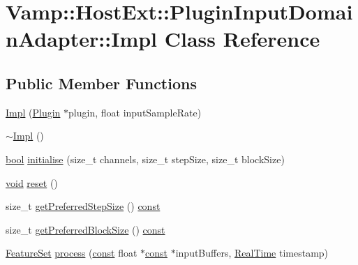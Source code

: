 \hypertarget{class_vamp_1_1_host_ext_1_1_plugin_input_domain_adapter_1_1_impl}{}\section{Vamp\+:\+:Host\+Ext\+:\+:Plugin\+Input\+Domain\+Adapter\+:\+:Impl Class Reference}
\label{class_vamp_1_1_host_ext_1_1_plugin_input_domain_adapter_1_1_impl}
\subsection*{Public Member Functions}
\begin{DoxyCompactItemize}
\item 
\hyperlink{class_vamp_1_1_host_ext_1_1_plugin_input_domain_adapter_1_1_impl_adffa09cc6be98d87cb33c1e92310c9fc}{Impl} (\hyperlink{class_vamp_1_1_plugin}{Plugin} $\ast$plugin, float input\+Sample\+Rate)
\item 
\hyperlink{class_vamp_1_1_host_ext_1_1_plugin_input_domain_adapter_1_1_impl_a2c75fc9191782ee69185c60f9b68cb90}{$\sim$\+Impl} ()
\item 
\hyperlink{mac_2config_2i386_2lib-src_2libsoxr_2soxr-config_8h_abb452686968e48b67397da5f97445f5b}{bool} \hyperlink{class_vamp_1_1_host_ext_1_1_plugin_input_domain_adapter_1_1_impl_a58c9bcbddcb7c3a1a3791b2a04e7372e}{initialise} (size\+\_\+t channels, size\+\_\+t step\+Size, size\+\_\+t block\+Size)
\item 
\hyperlink{sound_8c_ae35f5844602719cf66324f4de2a658b3}{void} \hyperlink{class_vamp_1_1_host_ext_1_1_plugin_input_domain_adapter_1_1_impl_ab4c8b082259289e412814c9a035bfc19}{reset} ()
\item 
size\+\_\+t \hyperlink{class_vamp_1_1_host_ext_1_1_plugin_input_domain_adapter_1_1_impl_a4380af577605306d2edab51042c71681}{get\+Preferred\+Step\+Size} () \hyperlink{getopt1_8c_a2c212835823e3c54a8ab6d95c652660e}{const} 
\item 
size\+\_\+t \hyperlink{class_vamp_1_1_host_ext_1_1_plugin_input_domain_adapter_1_1_impl_ab530681a774b29db3fd059149f4c1bf9}{get\+Preferred\+Block\+Size} () \hyperlink{getopt1_8c_a2c212835823e3c54a8ab6d95c652660e}{const} 
\item 
\hyperlink{class_vamp_1_1_plugin_a448fb57dc245d47923ec9eeaf9856c5f}{Feature\+Set} \hyperlink{class_vamp_1_1_host_ext_1_1_plugin_input_domain_adapter_1_1_impl_a1bd8c3ca5ce5d8254d2d4af910cc31f0}{process} (\hyperlink{getopt1_8c_a2c212835823e3c54a8ab6d95c652660e}{const} float $\ast$\hyperlink{getopt1_8c_a2c212835823e3c54a8ab6d95c652660e}{const} $\ast$input\+Buffers, \hyperlink{struct_vamp_1_1_real_time}{Real\+Time} timestamp)

\end{DoxyCompactItemize}
